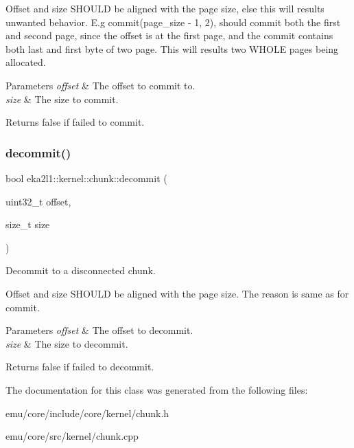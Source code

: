 Offset and size S\+H\+O\+U\+LD be aligned with the page size, else this will results unwanted behavior. E.\+g commit(page\+\_\+size -\/ 1, 2), should commit both the first and second page, since the offset is at the first page, and the commit contains both last and first byte of two page. This will results two W\+H\+O\+LE pages being allocated. 
\begin{DoxyParams}{Parameters}
{\em offset} & The offset to commit to. \\
\hline
{\em size} & The size to commit. \\
\hline
\end{DoxyParams}
\begin{DoxyReturn}{Returns}
false if failed to commit. 
\end{DoxyReturn}
\mbox{\label{classeka2l1_1_1kernel_1_1chunk_a4d3ca523dd234163473a5041de63ab78}} 
\subsubsection{\texorpdfstring{decommit()}{decommit()}}
{\footnotesize\ttfamily bool eka2l1\+::kernel\+::chunk\+::decommit (\begin{DoxyParamCaption}\item[{uint32\+\_\+t}]{offset,  }\item[{size\+\_\+t}]{size }\end{DoxyParamCaption})}



Decommit to a disconnected chunk. 

Offset and size S\+H\+O\+U\+LD be aligned with the page size. The reason is same as for commit. 
\begin{DoxyParams}{Parameters}
{\em offset} & The offset to decommit. \\
\hline
{\em size} & The size to decommit. \\
\hline
\end{DoxyParams}
\begin{DoxyReturn}{Returns}
false if failed to decommit. 
\end{DoxyReturn}


The documentation for this class was generated from the following files\+:\begin{DoxyCompactItemize}
\item 
emu/core/include/core/kernel/chunk.\+h\item 
emu/core/src/kernel/chunk.\+cpp\end{DoxyCompactItemize}
